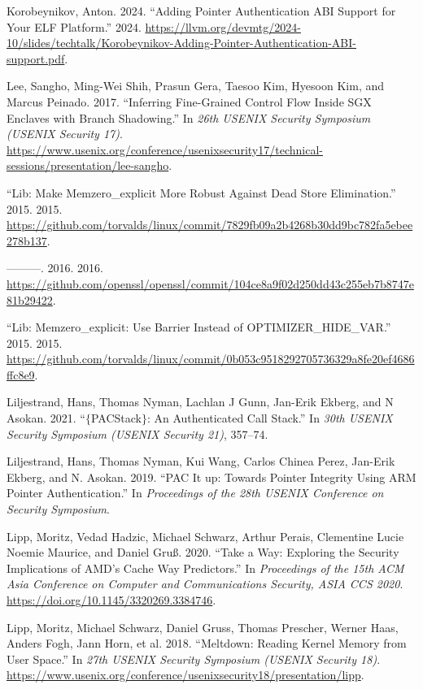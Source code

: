 \documentclass[
  a4paper,
]{report}
\newlength{\cslhangindent}
\newenvironment{CSLReferences}[2] %
{\begin{list}{}{%
	\setlength{\itemindent}{0pt}
	\setlength{\leftmargin}{0pt}
	\setlength{\parsep}{0pt}
	\ifodd #1
	\setlength{\leftmargin}{\cslhangindent}
	\setlength{\itemindent}{-1\cslhangindent}
	\fi
	\setlength{\itemsep}{#2\baselineskip}}}
{\end{list}}
\begin{document}
\begin{CSLReferences}{1}{0}
Korobeynikov, Anton. 2024. {``Adding Pointer Authentication ABI Support
for Your ELF Platform.''} 2024.
\url{https://llvm.org/devmtg/2024-10/slides/techtalk/Korobeynikov-Adding-Pointer-Authentication-ABI-support.pdf}.

Lee, Sangho, Ming-Wei Shih, Prasun Gera, Taesoo Kim, Hyesoon Kim, and
Marcus Peinado. 2017. {``Inferring Fine-Grained Control Flow Inside
{SGX} Enclaves with Branch Shadowing.''} In \emph{26th USENIX Security
Symposium (USENIX Security 17)}.
\url{https://www.usenix.org/conference/usenixsecurity17/technical-sessions/presentation/lee-sangho}.

{``Lib: Make Memzero\_explicit More Robust Against Dead Store
Elimination.''} 2015. 2015.
\url{https://github.com/torvalds/linux/commit/7829fb09a2b4268b30dd9bc782fa5ebee278b137}.

---------. 2016. 2016.
\url{https://github.com/openssl/openssl/commit/104ce8a9f02d250dd43c255eb7b8747e81b29422}.

{``Lib: Memzero\_explicit: Use Barrier Instead of
{OPTIMIZER\_HIDE\_VAR}.''} 2015. 2015.
\url{https://github.com/torvalds/linux/commit/0b053c9518292705736329a8fe20ef4686ffc8e9}.

Liljestrand, Hans, Thomas Nyman, Lachlan J Gunn, Jan-Erik Ekberg, and N
Asokan. 2021. {``\(\{\)PACStack\(\}\): An Authenticated Call Stack.''}
In \emph{30th USENIX Security Symposium (USENIX Security 21)}, 357--74.

Liljestrand, Hans, Thomas Nyman, Kui Wang, Carlos Chinea Perez, Jan-Erik
Ekberg, and N. Asokan. 2019. {``PAC It up: Towards Pointer Integrity
Using ARM Pointer Authentication.''} In \emph{Proceedings of the 28th
USENIX Conference on Security Symposium}.

Lipp, Moritz, Vedad Hadzic, Michael Schwarz, Arthur Perais, Clementine
Lucie Noemie Maurice, and Daniel Gruß. 2020. {``Take a Way: Exploring
the Security Implications of AMD's Cache Way Predictors.''} In
\emph{Proceedings of the 15th ACM Asia Conference on Computer and
Communications Security, ASIA CCS 2020}.
\url{https://doi.org/10.1145/3320269.3384746}.

Lipp, Moritz, Michael Schwarz, Daniel Gruss, Thomas Prescher, Werner
Haas, Anders Fogh, Jann Horn, et al. 2018. {``Meltdown: Reading Kernel
Memory from User Space.''} In \emph{27th USENIX Security Symposium
(USENIX Security 18)}.
\url{https://www.usenix.org/conference/usenixsecurity18/presentation/lipp}.


\end{CSLReferences}
\end{document}
